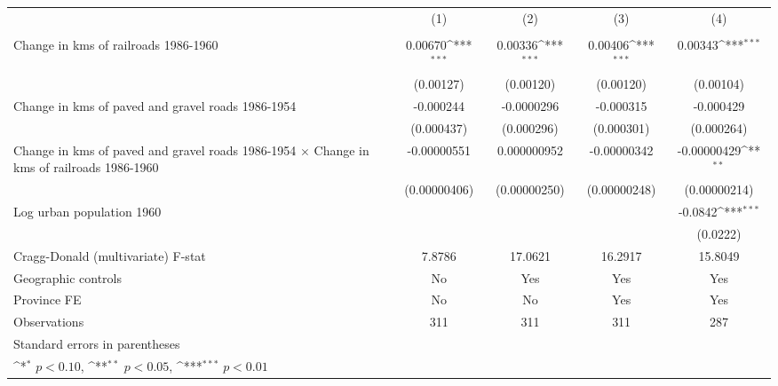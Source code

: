 {
\def\sym#1{\ifmmode^{#1}\else\(^{#1}\)\fi}
\begin{tabular}{l*{4}{c}}
\hline\hline
                &\multicolumn{1}{c}{(1)}&\multicolumn{1}{c}{(2)}&\multicolumn{1}{c}{(3)}&\multicolumn{1}{c}{(4)}\\
                &\multicolumn{1}{c}{}&\multicolumn{1}{c}{}&\multicolumn{1}{c}{}&\multicolumn{1}{c}{}\\
\hline
Change in kms of railroads 1986-1960&  0.00670\sym{***}&  0.00336\sym{***}&  0.00406\sym{***}&  0.00343\sym{***}\\
                &(0.00127)         &(0.00120)         &(0.00120)         &(0.00104)         \\
[1em]
Change in kms of paved and gravel roads 1986-1954&-0.000244         &-0.0000296         &-0.000315         &-0.000429         \\
                &(0.000437)         &(0.000296)         &(0.000301)         &(0.000264)         \\
[1em]
Change in kms of paved and gravel roads 1986-1954 $\times$ Change in kms of railroads 1986-1960&-0.00000551         &0.000000952         &-0.00000342         &-0.00000429\sym{**} \\
                &(0.00000406)         &(0.00000250)         &(0.00000248)         &(0.00000214)         \\
[1em]
Log urban population 1960&                  &                  &                  &  -0.0842\sym{***}\\
                &                  &                  &                  & (0.0222)         \\
\hline
Cragg-Donald (multivariate) F-stat&   7.8786         &  17.0621         &  16.2917         &  15.8049         \\
Geographic controls&       No         &      Yes         &      Yes         &      Yes         \\
Province FE     &       No         &       No         &      Yes         &      Yes         \\
Observations    &      311         &      311         &      311         &      287         \\
\hline\hline
\multicolumn{5}{l}{\footnotesize Standard errors in parentheses}\\
\multicolumn{5}{l}{\footnotesize \sym{*} \(p<0.10\), \sym{**} \(p<0.05\), \sym{***} \(p<0.01\)}\\
\end{tabular}
}
